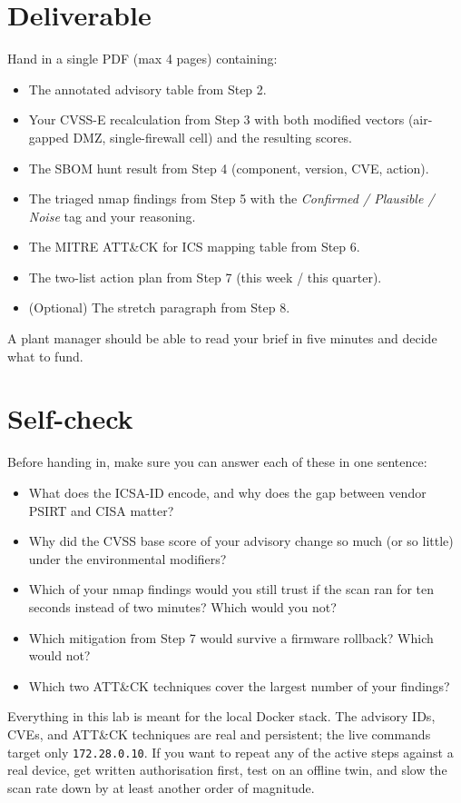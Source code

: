 \documentclass[11pt,a4paper]{article}
\begin{document}
\section*{Deliverable}

\begin{deliverbox}
Hand in a single PDF (max 4 pages) containing:
\begin{itemize}\setlength{\itemsep}{1pt}
  \item The annotated advisory table from Step 2.
  \item Your CVSS-E recalculation from Step 3 with both modified vectors (air-gapped DMZ, single-firewall cell) and the resulting scores.
  \item The SBOM hunt result from Step 4 (component, version, CVE, action).
  \item The triaged nmap findings from Step 5 with the \emph{Confirmed / Plausible / Noise} tag and your reasoning.
  \item The MITRE ATT\&CK for ICS mapping table from Step 6.
  \item The two-list action plan from Step 7 (this week / this quarter).
  \item (Optional) The stretch paragraph from Step 8.
\end{itemize}
A plant manager should be able to read your brief in five minutes and decide what to fund.
\end{deliverbox}

\section*{Self-check}

Before handing in, make sure you can answer each of these in one sentence:

\begin{itemize}\setlength{\itemsep}{1pt}
  \item What does the ICSA-ID encode, and why does the gap between vendor PSIRT and CISA matter?
  \item Why did the CVSS base score of your advisory change so much (or so little) under the environmental modifiers?
  \item Which of your nmap findings would you still trust if the scan ran for ten seconds instead of two minutes? Which would you not?
  \item Which mitigation from Step 7 would survive a firmware rollback? Which would not?
  \item Which two ATT\&CK techniques cover the largest number of your findings?
\end{itemize}

\begin{warnbox}
Everything in this lab is meant for the local Docker stack. The advisory IDs, CVEs, and ATT\&CK techniques are real and persistent; the live commands target only \texttt{172.28.0.10}. If you want to repeat any of the active steps against a real device, get written authorisation first, test on an offline twin, and slow the scan rate down by at least another order of magnitude.
\end{warnbox}
\end{document}
